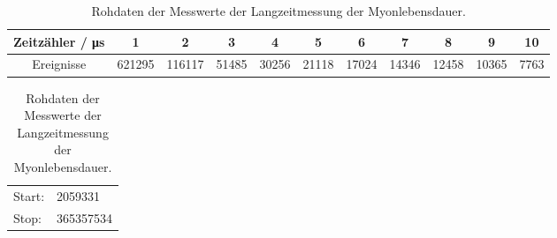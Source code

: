 \begin{table}[H]
    \centering
    \caption{Rohdaten der Messwerte der Langzeitmessung der Myonlebensdauer.}
    \label{tab:lebensdauer_rohdaten}
    \begin{tabular}{ccccccccccc}
        \toprule
        Zeitzähler / \si{\micro\second}
            & 1 & 2 & 3 & 4 & 5 & 6 & 7 & 8 & 9 & 10 \\
        \midrule
        Ereignisse
            & 621295
            & 116117
            & 51485
            & 30256
            & 21118
            & 17024
            & 14346
            & 12458
            & 10365
            & 7763 \\
        \bottomrule
    \end{tabular}

    \vspace{0.5em}

    \begin{tabular}{ll}
        Start: & 2059331 \\
        Stop:  & 365357534 \\
    \end{tabular}
\end{table}
